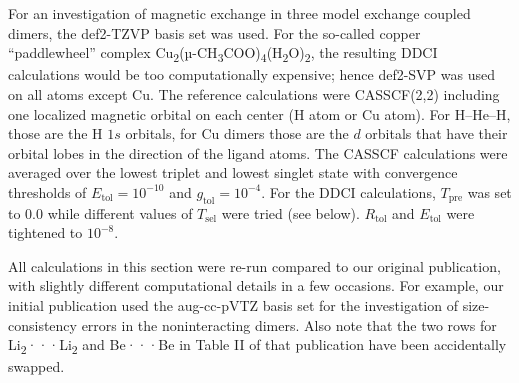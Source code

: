 For an investigation of magnetic exchange in three model exchange coupled dimers, the def2-TZVP basis set was used. For the so-called copper ``paddlewheel'' complex  Cu\textsubscript{2}(µ-CH\textsubscript{3}COO)\textsubscript{4}(H\textsubscript{2}O)\textsubscript{2}, the resulting DDCI calculations would be too computationally expensive; hence def2-SVP was used on all atoms except Cu.
The reference calculations were CASSCF(2,2) including one localized magnetic orbital on each center (H atom or Cu atom). For H--He--H, those are the H $1s$ orbitals, for Cu dimers those are the $d$ orbitals that have their orbital lobes in the direction of the ligand atoms. The CASSCF calculations were averaged over the lowest triplet and lowest singlet state with convergence thresholds of $E_\text{tol} = 10^{-10}$ and $g_\text{tol} = 10^{-4}$. For the DDCI calculations, $T_\text{pre}$ was set to 0.0 while different values of $T_\text{sel}$ were tried (see below). $R_\text{tol}$ and $E_\text{tol}$ were tightened to $10^{-8}$.

All calculations in this section were re-run compared to our original publication,\cite{PathaLN_2017_234109} with slightly different computational details in a few occasions. For example, our initial publication used the aug-cc-pVTZ basis set for the investigation of size-consistency errors in the noninteracting dimers. Also note that the two rows for Li\textsubscript{2}···Li\textsubscript{2} and Be···Be in Table II of that publication have been accidentally swapped.

